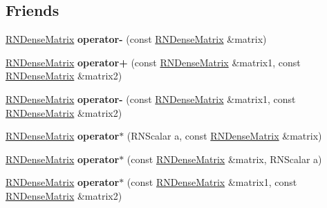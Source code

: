 \subsection*{Friends}
\begin{DoxyCompactItemize}
\item 
\hyperlink{class_r_n_dense_matrix}{R\+N\+Dense\+Matrix} {\bfseries operator-\/} (const \hyperlink{class_r_n_dense_matrix}{R\+N\+Dense\+Matrix} \&matrix)\hypertarget{class_r_n_dense_matrix_adc7098005a7a60c39d284d7f279efbad}{}\label{class_r_n_dense_matrix_adc7098005a7a60c39d284d7f279efbad}

\item 
\hyperlink{class_r_n_dense_matrix}{R\+N\+Dense\+Matrix} {\bfseries operator+} (const \hyperlink{class_r_n_dense_matrix}{R\+N\+Dense\+Matrix} \&matrix1, const \hyperlink{class_r_n_dense_matrix}{R\+N\+Dense\+Matrix} \&matrix2)\hypertarget{class_r_n_dense_matrix_a6dee479e1f75f2fd2661736bf5b618a9}{}\label{class_r_n_dense_matrix_a6dee479e1f75f2fd2661736bf5b618a9}

\item 
\hyperlink{class_r_n_dense_matrix}{R\+N\+Dense\+Matrix} {\bfseries operator-\/} (const \hyperlink{class_r_n_dense_matrix}{R\+N\+Dense\+Matrix} \&matrix1, const \hyperlink{class_r_n_dense_matrix}{R\+N\+Dense\+Matrix} \&matrix2)\hypertarget{class_r_n_dense_matrix_a6bf9b353495790d659970050ec578cc9}{}\label{class_r_n_dense_matrix_a6bf9b353495790d659970050ec578cc9}

\item 
\hyperlink{class_r_n_dense_matrix}{R\+N\+Dense\+Matrix} {\bfseries operator$\ast$} (R\+N\+Scalar a, const \hyperlink{class_r_n_dense_matrix}{R\+N\+Dense\+Matrix} \&matrix)\hypertarget{class_r_n_dense_matrix_ae87644ceb170415ab9d46b398825e854}{}\label{class_r_n_dense_matrix_ae87644ceb170415ab9d46b398825e854}

\item 
\hyperlink{class_r_n_dense_matrix}{R\+N\+Dense\+Matrix} {\bfseries operator$\ast$} (const \hyperlink{class_r_n_dense_matrix}{R\+N\+Dense\+Matrix} \&matrix, R\+N\+Scalar a)\hypertarget{class_r_n_dense_matrix_a391336a9bb67066539061f3c43e7b0b6}{}\label{class_r_n_dense_matrix_a391336a9bb67066539061f3c43e7b0b6}

\item 
\hyperlink{class_r_n_dense_matrix}{R\+N\+Dense\+Matrix} {\bfseries operator$\ast$} (const \hyperlink{class_r_n_dense_matrix}{R\+N\+Dense\+Matrix} \&matrix1, const \hyperlink{class_r_n_dense_matrix}{R\+N\+Dense\+Matrix} \&matrix2)\hypertarget{class_r_n_dense_matrix_a8e2eddbc083e8667b0c766e72d00b050}{}\label{class_r_n_dense_matrix_a8e2eddbc083e8667b0c766e72d00b050}


\end{DoxyCompactItemize}
